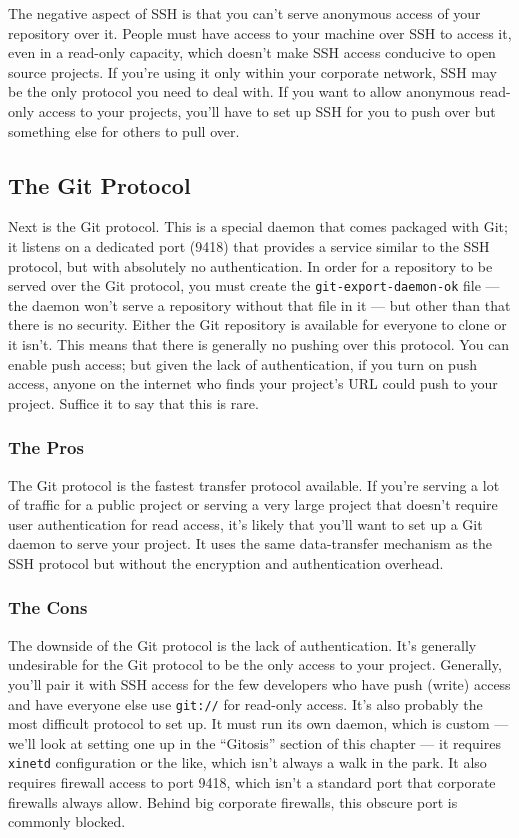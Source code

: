 \documentclass[a4paper]{book}
\begin{document}
The negative aspect of SSH is that you can't serve anonymous access of your repository over it. People must have access to your machine over SSH to access it, even in a read-only capacity, which doesn't make SSH access conducive to open source projects. If you're using it only within your corporate network, SSH may be the only protocol you need to deal with. If you want to allow anonymous read-only access to your projects, you'll have to set up SSH for you to push over but something else for others to pull over.

\subsection{The Git Protocol}

Next is the Git protocol. This is a special daemon that comes packaged with Git; it listens on a dedicated port (9418) that provides a service similar to the SSH protocol, but with absolutely no authentication. In order for a repository to be served over the Git protocol, you must create the \texttt{git-export-daemon-ok} file --- the daemon won't serve a repository without that file in it --- but other than that there is no security. Either the Git repository is available for everyone to clone or it isn't. This means that there is generally no pushing over this protocol. You can enable push access; but given the lack of authentication, if you turn on push access, anyone on the internet who finds your project's URL could push to your project. Suffice it to say that this is rare.

\subsubsection{The Pros}

The Git protocol is the fastest transfer protocol available. If you're serving a lot of traffic for a public project or serving a very large project that doesn't require user authentication for read access, it's likely that you'll want to set up a Git daemon to serve your project. It uses the same data-transfer mechanism as the SSH protocol but without the encryption and authentication overhead.

\subsubsection{The Cons}

The downside of the Git protocol is the lack of authentication. It's generally undesirable for the Git protocol to be the only access to your project. Generally, you'll pair it with SSH access for the few developers who have push (write) access and have everyone else use \texttt{git://} for read-only access. It's also probably the most difficult protocol to set up. It must run its own daemon, which is custom --- we'll look at setting one up in the “Gitosis” section of this chapter --- it requires \texttt{xinetd} configuration or the like, which isn't always a walk in the park. It also requires firewall access to port 9418, which isn't a standard port that corporate firewalls always allow. Behind big corporate firewalls, this obscure port is commonly blocked.
\end{document}
